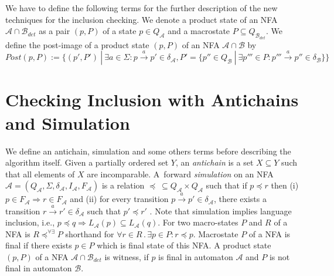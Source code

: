 We have to define the following terms for the further description of the new techniques for the inclusion checking.
We denote a product state of an NFA $\mathcal{A} \cap \mathcal{B}_{det}$ as a pair $(p,P)$ of a state $p\in Q_\mathcal{A}$ and a 
macrostate $P \subseteq Q_{\mathcal{B}_{det}}$.
We define the post-image of a product state $(p,P)$ of an NFA $\mathcal{A}\cap \mathcal{B}$ by
$Post(p,P):=\{(p',P')\ |\ \exists a \in \Sigma: p\xrightarrow{a} p' \in \delta_\mathcal{A}, P'=
\{p''\in Q_\mathcal{B}\ |\ \exists p''' \in P:p'''\xrightarrow{a} p''\in \delta_\mathcal{B}\}\}$

\section{Checking Inclusion with Antichains and Simulation}
\label{sectionAntichain}
We define an antichain, simulation and some others terms before describing the algorithm itself.
Given a partially ordered set $Y$, an \emph {antichain} is a set $X \subseteq Y$ such that all elements of $X$ are incomparable.
A~forward \emph{simulation} on an NFA $\mathcal{A}=(Q_\mathcal{A},\Sigma,\delta_\mathcal{A},I_\mathcal{A},F_\mathcal{A})$ 
is a relation $\preceq\  \subseteq Q_\mathcal{A} \times Q_\mathcal{A}$ 
such that if $p \preceq r$ then (i) $p \in F_\mathcal{A} 
\Rightarrow r \in F_\mathcal{A}$ and (ii) for every transition $p\xrightarrow{a}p' \in \delta_\mathcal{A}$, there exists a transition 
$r\xrightarrow{a}r' \in \delta_\mathcal{A}$ such that $p' \preceq r'$  \cite{focs95}. 
Note that simulation implies language inclusion, i.e., $p\preceq q \Rightarrow L_\mathcal{A}(p)
\subseteq L_\mathcal{A}(q)$. 
%
For two macro-states $P$ and $R$ of a NFA is $R\preceq^{\forall\exists}P$ shorthand for $\forall r\in R\,.\,\exists p \in P: r \preceq p$.
Macrostate $P$ of a NFA is final if there exists $p\in P$ which is final state of this NFA.
A product state $(p,P)$ of a NFA $\mathcal{A} \cap \mathcal{B}_{det}$ is witness, if $p$ is final in automaton $\mathcal{A}$ 
and $P$ is not final in automaton $\mathcal{B}$. %

